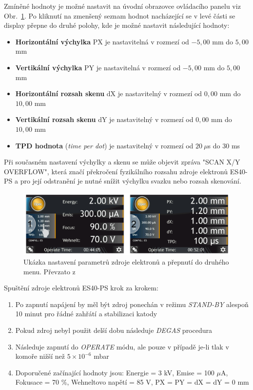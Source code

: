Zmíněné hodnoty je možné nastavit na úvodní obrazovce ovládacího panelu viz Obr.~\ref{04display}. Po kliknutí na zmenšený seznam hodnot nacházející se v levé části se display přepne do druhé polohy, kde je možné nastavit následující hodnoty:
\begin{itemize}
\item \textbf{Horizontální výchylka} PX je nastavitelná v rozmezí od $-5{,}00$ mm do $5{,}00$ mm 
\item \textbf{Vertikální výchylka} PY je nastavitelná v rozmezí od $-5{,}00$ mm do $5{,}00$ mm 
\item \textbf{Horizontální rozsah skenu} dX je nastavitelný v rozmezí od $0{,}00$ mm do $10{,}00$ mm
\item \textbf{Vertikální rozsah skenu} dY je nastavitelný v rozmezí od $0{,}00$ mm do $10{,}00$ mm
\item \textbf{TPD hodnota} (\textit{time per dot}) je nastavitelný v rozmezí od $20 \ \mu$s  do $30$ ms
\end{itemize}
Při současném nastavení výchylky a skenu se může objevit zpráva "SCAN X/Y OVERFLOW", která značí překročení fyzikálního rozsahu zdroje elektronů ES40-PS a pro její odstranění je nutné snížit výchylku svazku nebo rozsah skenování. 

\begin{figure}[htbp!]
\centering
\includegraphics[width = 370 pt]{Figure/04/display.png}
\caption[Ukázka nastavení parametrů zdroje elektronů]{Ukázka nastavení parametrů zdroje elektronů a přepnutí do druhého menu. Převzato z~\cite{Manual}}
\label{04display}
\end{figure}

%

Spuštění zdroje elektronů ES40-PS krok za krokem:
\begin{enumerate}
\item Po zapnutí napájení by měl být zdroj ponechán v režimu \textit{STAND-BY} alespoň 10 minut pro řádné zahřátí a stabilizaci katody
\item Pokud zdroj nebyl použit delší dobu následuje \textit{DEGAS} procedura
\item Následuje zapnutí do \textit{OPERATE} módu, ale pouze v případě je-li tlak v komoře nižší než $5 \times 10^{-6}$ mbar
\item Doporučené začínající hodnoty jsou: Energie = 3 kV, Emise = 100 $\mu$A, Fokusace = 70 \%, Wehneltovo napětí = 85 V, PX = PY = dX = dY = 0 mm
\end{enumerate} 


